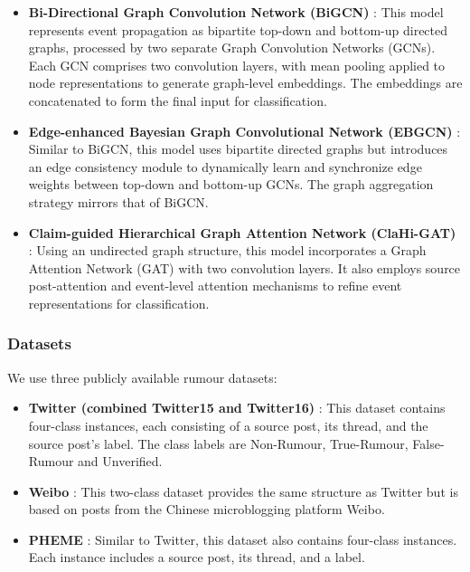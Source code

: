\begin{itemize} 
\item \textbf{Bi-Directional Graph Convolution Network (BiGCN)} \cite{Bian2020RumorDO}: This model represents event propagation as bipartite top-down and bottom-up directed graphs, processed by two separate Graph Convolution Networks (GCNs). Each GCN comprises two convolution layers, with mean pooling applied to node representations to generate graph-level embeddings. The embeddings are concatenated to form the final input for classification.

\item \textbf{Edge-enhanced Bayesian Graph Convolutional Network (EBGCN)} \cite{wei-etal-2021-towards}: Similar to BiGCN, this model uses bipartite directed graphs but introduces an edge consistency module to dynamically learn and synchronize edge weights between top-down and bottom-up GCNs. The graph aggregation strategy mirrors that of BiGCN.

\item \textbf{Claim-guided Hierarchical Graph Attention Network (ClaHi-GAT)} \cite{lin-etal-2021-rumor}: Using an undirected graph structure, this model incorporates a Graph Attention Network (GAT) with two convolution layers. It also employs source post-attention and event-level attention mechanisms to refine event representations for classification.
\end{itemize}

\subsubsection{Datasets}
We use three publicly available rumour datasets:

\begin{itemize}
\item \textbf{Twitter (combined Twitter15 and Twitter16)} \cite{ma2016detecting}: This dataset contains four-class instances, each consisting of a source post, its thread, and the source post’s label. The class labels are Non-Rumour, True-Rumour, False-Rumour and Unverified.

\item \textbf{Weibo} \cite{ma2016detecting}: This two-class dataset provides the same structure as Twitter but is based on posts from the Chinese microblogging platform Weibo.

\item \textbf{PHEME} \cite{Zubiaga2015AnalysingHP}: Similar to Twitter, this dataset also contains four-class instances. Each instance includes a source post, its thread, and a label.

\end{itemize}

